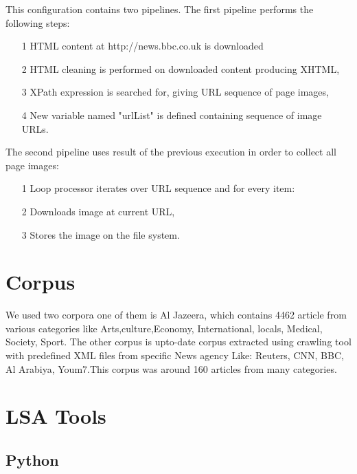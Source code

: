 This configuration contains two pipelines. The first pipeline performs the following steps:
\begin{itemize}
\item [1] HTML content at http://news.bbc.co.uk is downloaded
\item [2] HTML cleaning is performed on downloaded content producing XHTML,
\item [3] XPath expression is searched for, giving URL sequence of page images,
\item [4] New variable named "urlList" is defined containing sequence of image URLs.
\end{itemize}
The second pipeline uses result of the previous execution in order to collect all page images:
\begin{itemize}
\item [1] Loop processor iterates over URL sequence and for every item:
\item [2] Downloads image at current URL,
\item [3] Stores the image on the file system.
\end{itemize}


\section{Corpus}\label{corpus}
We used two corpora one of them is Al Jazeera, which contains 4462 article from various categories like Arts,culture,Economy, International, locals, Medical, Society, Sport.
The other corpus is upto-date corpus extracted using crawling tool with predefined XML files from specific News agency Like: Reuters, CNN, BBC, Al Arabiya, Youm7.This corpus was around 160 articles from many categories.


\section{LSA Tools}\label{lsa}
\subsection{Python}
